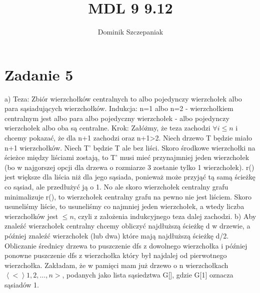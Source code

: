 \documentclass[12pt]{article}
\title{MDL 9 9.12}
\author{Dominik Szczepaniak}
\newcommand{\sequence}[1]{\left\langle #1 \right\rangle} %
\begin{document}
\maketitle

\bgroup\obeylines

\section{Zadanie 5} 
a) Teza: Zbiór wierzchołków centralnych to albo pojedynczy wierzchołek albo para sąsiadujących wierzchołków.
Indukcja:
n=1 albo n=2 - wierzchołkiem centralnym jest albo para albo pojedyczny wierzchołek - albo pojedynczy wierzchołek albo oba są centralne.
Krok:
Załóżmy, że teza zachodzi $\forall i \leq n$ i chcemy pokazać, że dla n+1 zachodzi oraz n+1>2.
Niech drzewo T będzie miało n+1 wierzchołków. Niech T' będzie T ale bez liści. Skoro środkowe wierzchołki na ścieżce między liściami zostają, to T' musi mieć przynajmniej jeden wierzchołek (bo w najgorszej opcji dla drzewa o rozmiarze 3 zostanie tylko 1 wierzchołek). r() jest większe dla liścia niż dla jego sąsiada, ponieważ może przyjąć tą samą ścieżkę co sąsiad, ale przedłużyć ją o 1. No ale skoro wierzchołek centralny grafu minimalizuje r(), to wierzchołek centralny grafu na pewno nie jest liściem. Skoro usuneliśmy liście, to usuneliśmy co najmniej jeden wierzchołek, a wtedy liczba wierzchołków jest $\leq n$, czyli z założenia indukcyjnego teza dalej zachodzi.
b)
Aby znaleźć wierzchołek centralny chcemy obliczyć najdłuższą ścieżkę d w drzewie, a później znaleźć wierzchołek (lub dwa) które mają najdłuższą ścieżkę d/2.
Obliczanie średnicy drzewa to puszczenie dfs z dowolnego wierzchołka i później ponowne puszczenie dfs z wierzchołka który był najdalej od pierwotnego wierzchołka.
Zakładam, że w pamięci mam już drzewo o n wierzchołkach $\sequence<1, 2, \dots, n>$, podanych jako lista sąsiedztwa G[], gdzie G[1] oznacza sąsiadów 1.
\end{document}
